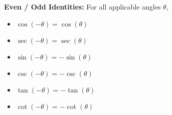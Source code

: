 \documentclass{ximera}
\begin{document}
\begin{callout}
 \textbf{Even / Odd Identities:}  For all applicable angles $\theta$, 
\begin{itemize}

\item  $\cos(-\theta) = \cos(\theta)$

\item  $\sec(-\theta) = \sec(\theta)$

\item  $\sin(-\theta) = -\sin(\theta)$

\item  $\csc(-\theta) = -\csc(\theta)$

\item  $\tan(-\theta) = -\tan(\theta)$

\item  $\cot(-\theta) = -\cot(\theta)$

\end{itemize}
\end{callout}




\end{document}
